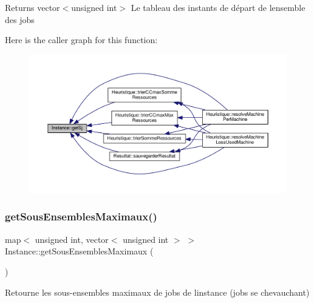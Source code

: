 \begin{DoxyReturn}{Returns}
vector$<$unsigned int$>$ Le tableau des instants de départ de l\textquotesingle{}ensemble des jobs 
\end{DoxyReturn}
Here is the caller graph for this function\+:
\nopagebreak
\begin{figure}[H]
\begin{center}
\leavevmode
\includegraphics[width=350pt]{classInstance_ab998bc8d9a8b03c8f6279573779217cc_icgraph}
\end{center}
\end{figure}
\mbox{\label{classInstance_a2011ff3253fcb1d2d354c3c34a14a6fb}} 
\subsubsection{\texorpdfstring{get\+Sous\+Ensembles\+Maximaux()}{getSousEnsemblesMaximaux()}}
{\footnotesize\ttfamily map$<$ unsigned int, vector$<$ unsigned int $>$ $>$ Instance\+::get\+Sous\+Ensembles\+Maximaux (\begin{DoxyParamCaption}{ }\end{DoxyParamCaption})}



Retourne les sous-\/ensembles maximaux de jobs de l\textquotesingle{}instance (jobs se chevauchant) 

